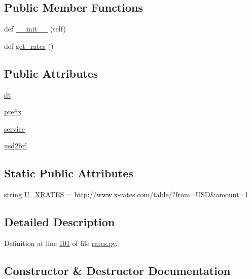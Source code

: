 \subsection*{Public Member Functions}
\begin{DoxyCompactItemize}
\item 
def \hyperlink{classrates_1_1_x_rates_a86fb4ba66a218c5f25b5b2c1f2a8345b}{\+\_\+\+\_\+init\+\_\+\+\_\+} (self)
\item 
def \hyperlink{classrates_1_1_x_rates_a034e274f1bf0a2509af2621eb27c7cce}{get\+\_\+rates} ()
\end{DoxyCompactItemize}
\subsection*{Public Attributes}
\begin{DoxyCompactItemize}
\item 
\hyperlink{classrates_1_1_x_rates_aa7835a0ac1d41af607d6d5885b49c131}{dt}
\item 
\hyperlink{classrates_1_1_x_rates_a3b92b41b0fbd77b44d01f094ff83dd9d}{prefix}
\item 
\hyperlink{classrates_1_1_x_rates_ad80e3c0295deaa15fac085324716747f}{service}
\item 
\hyperlink{classrates_1_1_x_rates_a79fbb88d6331909d4023129dde29d2b8}{usd2brl}
\end{DoxyCompactItemize}
\subsection*{Static Public Attributes}
\begin{DoxyCompactItemize}
\item 
string \hyperlink{classrates_1_1_x_rates_ab3bd64c08e6503f0d76c9f73dc38fa25}{U\+\_\+\+X\+R\+A\+T\+ES} = \textquotesingle{}http\+://www.\+x-\/rates.\+com/table/?from=U\+SD\&amount=1\textquotesingle{}
\end{DoxyCompactItemize}


\subsection{Detailed Description}


Definition at line \hyperlink{rates_8py_source_l00101}{101} of file \hyperlink{rates_8py_source}{rates.\+py}.



\subsection{Constructor \& Destructor Documentation}
